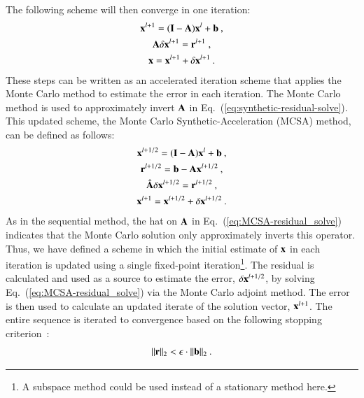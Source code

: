 \documentclass[preprint,12pt]{elsarticle}
\newcommand{\vA}{\ensuremath{\ve{A}}}
\newcommand{\vb}{\ensuremath{\ve{b}}}
\newcommand{\vx}{\ensuremath{\ve{x}}}
\newcommand{\vr}{\ensuremath{\ve{r}}}
\newcommand{\vI}{\ensuremath{\ve{I}}}
\begin{document}
The following scheme will then converge in one iteration:
\begin{subequations}
  \begin{gather}
    \vx^{l+1} = (\vI - \vA)\vx^l + \vb\:,\\ \vA \delta \vx^{l+1} =
    \vr^{l+1}\;,
    \label{eq:synthetic-residual-solve}\\
    \vx=\vx^{l+1}+\delta\vx^{l+1}\:.
  \end{gather}
\end{subequations}
These steps can be written as an accelerated iteration scheme that applies the
Monte Carlo method to estimate the error in each iteration. The Monte Carlo
method is used to approximately invert $\vA$ in
Eq.~(\ref{eq:synthetic-residual-solve}). This updated scheme, the Monte Carlo
Synthetic-Acceleration (MCSA) method, can be defined as follows:
\begin{subequations}
  \label{eq:MCSA-iteration}
  \begin{gather}
    \vx^{l+1/2} = (\vI - \vA)\vx^l + \vb\:,\\  \vr^{l+1/2} = \vb -
    \vA\vx^{l+1/2}\:,
    \label{eq:MCSA-residual}\\
     \hat{\vA}\delta\vx^{l+1/2} = \vr^{l+1/2}\:,
    \label{eq:MCSA-residual_solve}\\
     \vx^{l+1}=\vx^{l+1/2}+\delta\vx^{l+1/2}\:.
  \end{gather}
  \label{eq:MCSA}
\end{subequations}
As in the sequential method, the hat on $\vA$ in
Eq.~(\ref{eq:MCSA-residual_solve}) indicates that the Monte Carlo solution
only approximately inverts this operator.  Thus, we have defined a scheme in
which the initial estimate of $\vx$ in each iteration is updated using a
single fixed-point iteration\footnote{A subspace method could be used instead
  of a stationary method here.}.  The residual is calculated and used as a
source to estimate the error, $\delta\vx^{l+1/2}$, by solving
Eq.~(\ref{eq:MCSA-residual_solve}) via the Monte Carlo adjoint method. The
error is then used to calculate an updated iterate of the solution vector,
$\vx^{l+1}$.  The entire sequence is iterated to convergence based on the
following stopping criterion~\cite{kelley_1995}:
\begin{equation}
  \|\vr\|_{2} < \epsilon\cdot\|\vb\|_2\:.
  \label{eq:stopping-criteria}
\end{equation}
\end{document}

